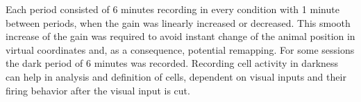 Each period consisted of 6 minutes recording in every condition with 1 minute between periods, when the gain was linearly increased or decreased. This smooth increase of the gain was required to avoid instant change of the animal position in virtual coordinates and, as a consequence, potential remapping. For some sessions the dark period of 6 minutes was recorded. Recording cell activity in darkness can help in analysis and definition of cells, dependent on visual inputs and their firing behavior after the visual input is cut.

\begin{figure}
\captionsetup{format=plain}
\caption[vGAIN]{
}
\end{figure}
